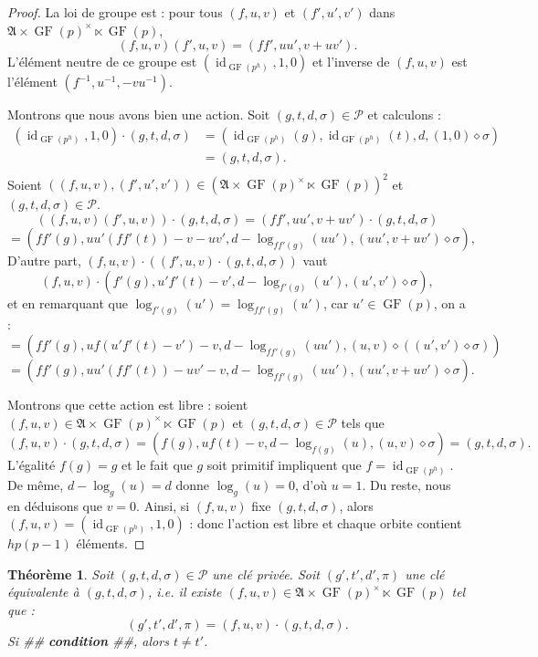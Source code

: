 \documentclass[a4paper, titlepage]{article}
\newtheorem{theo}{Théorème}[section]
\theoremstyle{definition}
\theoremstyle{remark}
\def\gf{\operatorname{GF}}
\def\id{\operatorname{id}}
\begin{document}
\begin{proof}
La loi de groupe est : pour tous $(f,u,v)$ et $(f',u',v')$ dans $\mathfrak{A} \times \gf(p)^\times \ltimes \gf(p)$,
$$(f,u,v)(f',u,v) = (ff',uu', v+uv').$$
L'élément neutre de ce groupe est $(\id_{\gf(p^h)}, 1, 0)$ et l'inverse de $(f,u,v)$ est l'élément $(f^{-1}, u^{-1}, -vu^{-1})$.

Montrons que nous avons bien une action. Soit $(g,t,d,\sigma) \in \mathcal{P}$ et calculons : 
\begin{align*}
(\id_{\gf(p^h)}, 1, 0) \cdot (g,t,d,\sigma) &= \left(\id_{\gf(p^h)}(g), \id_{\gf(p^h)}(t),d,(1,0)\diamond\sigma \right)\\
&= \left(g, t,d, \sigma \right).\\
\end{align*}
Soient $((f,u,v),(f',u',v')) \in ({\mathfrak{A} \times \gf(p)^\times \ltimes \gf(p)})^2$  et $(g,t,d,\sigma) \in \mathcal{P}$.
$$((f,u,v)(f',u,v)) \cdot (g,t,d,\sigma) = (ff', uu', v+uv') \cdot (g,t,d,\sigma)$$
$$= \left(ff'(g), uu'(ff'(t)) - v-uv',d - \log_{ff'(g)}(uu'),(uu', v+uv')\diamond\sigma \right),$$
D'autre part, $(f,u,v)\cdot\left((f',u,v) \cdot (g,t,d,\sigma)\right)$ vaut
$$(f,u,v)\cdot (f'(g),u'f'(t)-v',d - \log_{f'(g)}(u'),(u',v')\diamond\sigma),$$
et en remarquant que $\log_{f'(g)}(u') = \log_{ff'(g)}(u')$, car $u' \in \gf(p)$, on a :
$$= \left(ff'(g), uf(u'f'(t) - v') -v,d - \log_{ff'(g)}(uu'),(u, v)\diamond((u',v')\diamond\sigma) \right)$$
$$= \left(ff'(g), uu'(ff'(t)) - uv' -v,d - \log_{ff'(g)}(uu'),(uu',v + uv')\diamond\sigma \right).$$

Montrons que cette action est libre : soient $(f,u,v)  \in \mathfrak{A} \times \gf(p)^\times \ltimes \gf(p)$ et $(g,t,d,\sigma) \in \mathcal{P}$ tels que
$$(f,u, v) \cdot (g,t,d,\sigma) =\left(f(g), uf(t)-v,d-\log_{f(g)}(u),(u,v)\diamond\sigma \right) =(g,t,d,\sigma).$$
L'égalité $f(g) = g$ et le fait que $g$ soit primitif impliquent que $f = \id_{\gf(p^h)}$. De même, $d-\log_{g}(u) = d$ donne $\log_{g}(u) = 0$, d'où $u=1$. Du reste, nous en déduisons que $v=0$. Ainsi, si $(f,u,v)$ fixe $(g,t,d,\sigma)$, alors $(f,u,v) = (\id_{\gf(p^h)},1,0)$ : donc l'action est libre et chaque orbite contient $hp(p-1)$ éléments.
\end{proof}

\begin{theo}
Soit $(g,t,d,\sigma) \in \mathcal{P}$ une clé privée. Soit $(g',t',d',\pi)$ une clé équivalente à $(g,t,d,\sigma)$, i.e. il existe $(f,u,v) \in {\mathfrak{A} \times \gf(p)^\times \ltimes \gf(p)}$ tel que : 
$$(g',t',d',\pi) = (f,u,v)\cdot(g,t,d,\sigma).$$
Si \#\# \textbf{condition} \#\#, alors $t\neq t'$.
\end{theo}
\end{document}
